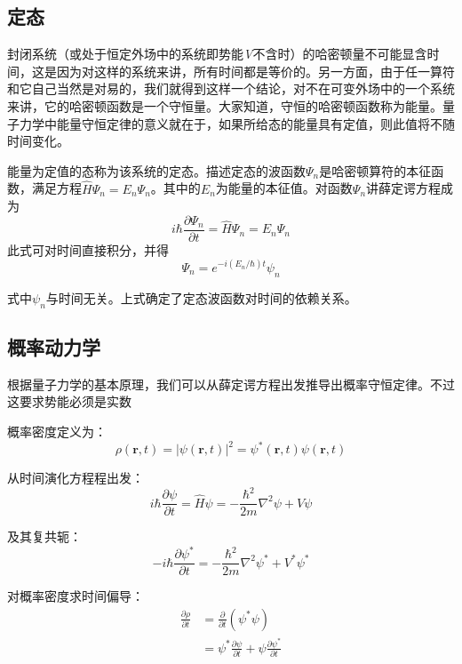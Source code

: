 \subsection{定态}
封闭系统（或处于恒定外场中的系统即势能\textit{V}不含时）的哈密顿量不可能显含时间，这是因为对这样的系统来讲，所有时间都是等价的。另一方面，由于任一算符和它自己当然是对易的，我们就得到这样一个结论，对不在可变外场中的一个系统来讲，它的哈密顿函数是一个守恒量。大家知道，守恒的哈密顿函数称为能量。量子力学中能量守恒定律的意义就在于，如果所给态的能量具有定值，则此值将不随时间变化。

能量为定值的态称为该系统的定态。描述定态的波函数$\Psi_{n}$是哈密顿算符的本征函数，满足方程$\hat{H}\Psi_{n}=E_{n}\Psi_{n}$。其中的$E_{n}$为能量的本征值。对函数$\Psi_{n}$讲薛定谔方程成为
\begin{equation}
	i\hbar\frac{\partial\Psi_{n}}{\partial t}=\hat{H}\Psi_{n}=E_{n}\Psi_{n}
\end{equation}
此式可对时间直接积分，并得
\begin{equation}
	\Psi_{n}=e^{-i(E_{n}/\hbar)t}\psi_{n}
\end{equation}

式中$\psi_{n}$与时间无关。上式确定了定态波函数对时间的依赖关系。

\subsection{概率动力学}
根据量子力学的基本原理，我们可以从薛定谔方程出发推导出概率守恒定律。不过这要求势能必须是实数\par
概率密度定义为：
\begin{equation}
	\rho(\mathbf{r}, t) = |\psi(\mathbf{r}, t)|^2 = \psi^*(\mathbf{r}, t)\psi(\mathbf{r}, t)
\end{equation}

从时间演化方程程出发：
\begin{equation}
	i\hbar\frac{\partial\psi}{\partial t} = \hat{H}\psi = -\frac{\hbar^2}{2m}\nabla^2\psi + V\psi
\end{equation}

及其复共轭：
\begin{equation}
	-i\hbar\frac{\partial\psi^*}{\partial t} = -\frac{\hbar^2}{2m}\nabla^2\psi^* + V^*\psi^*
\end{equation}

对概率密度求时间偏导：
\begin{align}
	\frac{\partial\rho}{\partial t} &= \frac{\partial}{\partial t}(\psi^*\psi) \\
	&= \psi^*\frac{\partial\psi}{\partial t} + \psi\frac{\partial\psi^*}{\partial t}
\end{align}

